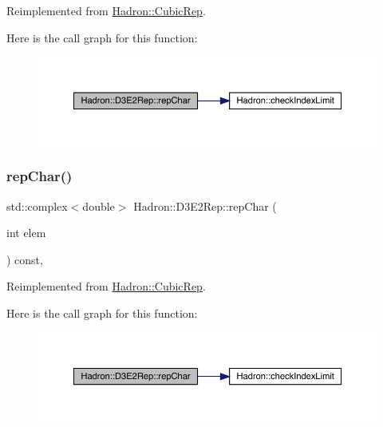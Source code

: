 Reimplemented from \mbox{\hyperlink{structHadron_1_1CubicRep_af45227106e8e715e84b0af69cd3b36f8}{Hadron\+::\+Cubic\+Rep}}.

Here is the call graph for this function\+:
\nopagebreak
\begin{figure}[H]
\begin{center}
\leavevmode
\includegraphics[width=350pt]{db/de8/structHadron_1_1D3E2Rep_a42a47ca21cfc9fe3d79daa1a5b697a2b_cgraph}
\end{center}
\end{figure}
\mbox{\label{structHadron_1_1D3E2Rep_a42a47ca21cfc9fe3d79daa1a5b697a2b}} 
\subsubsection{\texorpdfstring{repChar()}{repChar()}\hspace{0.1cm}{\footnotesize\ttfamily [3/3]}}
{\footnotesize\ttfamily std\+::complex$<$double$>$ Hadron\+::\+D3\+E2\+Rep\+::rep\+Char (\begin{DoxyParamCaption}\item[{int}]{elem }\end{DoxyParamCaption}) const\hspace{0.3cm}{\ttfamily [inline]}, {\ttfamily [virtual]}}



Reimplemented from \mbox{\hyperlink{structHadron_1_1CubicRep_af45227106e8e715e84b0af69cd3b36f8}{Hadron\+::\+Cubic\+Rep}}.

Here is the call graph for this function\+:
\nopagebreak
\begin{figure}[H]
\begin{center}
\leavevmode
\includegraphics[width=350pt]{db/de8/structHadron_1_1D3E2Rep_a42a47ca21cfc9fe3d79daa1a5b697a2b_cgraph}
\end{center}
\end{figure}
\mbox{\label{structHadron_1_1D3E2Rep_a941daa264ff6a6495a1bb521abe9021b}} 
